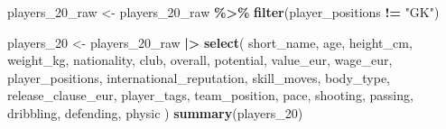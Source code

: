 \documentclass[
]{article}
\newenvironment{Shaded}{\begin{snugshade}}{\end{snugshade}}
\newcommand{\FunctionTok}[1]{\textcolor[rgb]{0.13,0.29,0.53}{\textbf{#1}}}
\newcommand{\NormalTok}[1]{#1}
\newcommand{\OtherTok}[1]{\textcolor[rgb]{0.56,0.35,0.01}{#1}}
\newcommand{\SpecialCharTok}[1]{\textcolor[rgb]{0.81,0.36,0.00}{\textbf{#1}}}
\newcommand{\StringTok}[1]{\textcolor[rgb]{0.31,0.60,0.02}{#1}}
\begin{document}
\begin{Shaded}
\begin{Highlighting}[]
\NormalTok{players\_20\_raw }\OtherTok{\textless{}{-}}\NormalTok{ players\_20\_raw }\SpecialCharTok{\%\textgreater{}\%} \FunctionTok{filter}\NormalTok{(player\_positions }\SpecialCharTok{!=} \StringTok{"GK"}\NormalTok{)}

\NormalTok{players\_20 }\OtherTok{\textless{}{-}}\NormalTok{ players\_20\_raw }\SpecialCharTok{|\textgreater{}} \FunctionTok{select}\NormalTok{(}
\NormalTok{  short\_name,}
\NormalTok{  age,}
\NormalTok{  height\_cm,}
\NormalTok{  weight\_kg,}
\NormalTok{  nationality,}
\NormalTok{  club,}
\NormalTok{  overall,}
\NormalTok{  potential,}
\NormalTok{  value\_eur,}
\NormalTok{  wage\_eur,}
\NormalTok{  player\_positions,}
\NormalTok{  international\_reputation,}
\NormalTok{  skill\_moves,}
\NormalTok{  body\_type,}
\NormalTok{  release\_clause\_eur,}
\NormalTok{  player\_tags,}
\NormalTok{  team\_position,}
\NormalTok{  pace,}
\NormalTok{  shooting,}
\NormalTok{  passing,}
\NormalTok{  dribbling,}
\NormalTok{  defending,}
\NormalTok{  physic}
\NormalTok{)}
\FunctionTok{summary}\NormalTok{(players\_20)}
\end{Highlighting}
\end{Shaded}
\end{document}
